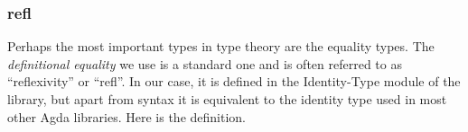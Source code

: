 \subsubsection{refl}\label{Equality.sssec:refl}
Perhaps the most important types in type theory are the equality types. The \emph{definitional equality} we use is a standard one and is often referred to as ``reflexivity'' or ``refl''.  In our case, it is defined in the Identity-Type module of the \TypeTopology library, but apart from syntax it is equivalent to the identity type used in most other Agda libraries. Here is the definition.
\ccpad
\begin{code}%
\>[0]\AgdaSpace{}%
\AgdaSpace{}%
\AgdaSymbol{\{}\AgdaSymbol{\}}\AgdaSpace{}%
\AgdaSymbol{\{}\AgdaSpace{}%
\AgdaSymbol{:}\AgdaSpace{}%
\AgdaSpace{}%
\AgdaSpace{}%
\AgdaSymbol{\}}\AgdaSpace{}%
\AgdaSymbol{:}\AgdaSpace{}%
\AgdaSpace{}%
\AgdaSpace{}%
\AgdaSpace{}%
\AgdaSpace{}%
\AgdaSpace{}%
\AgdaSpace{}%
\<%
\\
\>[0][@{}l@{\AgdaIndent{0}}]%
\>[2]\AgdaSpace{}%
\AgdaSymbol{:}\AgdaSpace{}%
\AgdaSymbol{\{}\AgdaSpace{}%
\AgdaSymbol{:}\AgdaSpace{}%
\AgdaSymbol{\}}\AgdaSpace{}%
\AgdaSpace{}%
\AgdaSpace{}%
\AgdaSpace{}%
\<%
\end{code}
\ccpad

